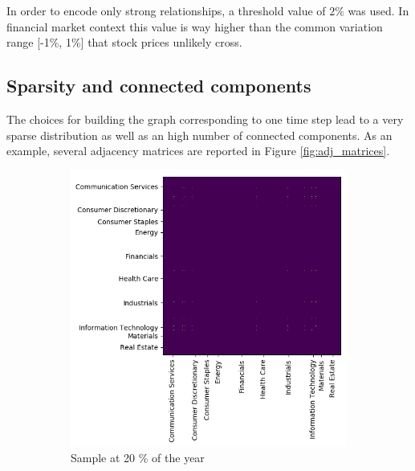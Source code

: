 \documentclass[12pt]{extarticle}
\begin{document}
In order to encode only strong relationships, a threshold value of $ 2 \% $ was used. In financial market context this value is way higher than the common variation range [-1\%, 1\%] that stock prices unlikely cross.  

\subsection{Sparsity and connected components}

The choices for building the graph corresponding to one time step lead to a very sparse distribution as well as an high number of connected components. As an example, several adjacency matrices are reported in Figure \ref{fig:adj_matrices}.

\begin{figure}[!h]
	\centering
	\begin{subfigure}{0.48\textwidth} %
		\includegraphics[width=\textwidth]{adj_50.png}
		\caption{Sample at 20 \% of the year} %
	\end{subfigure}
	\vspace{1em} %
	\begin{subfigure}{0.48\textwidth} %

\end{subfigure}
\end{figure}
\end{document}
